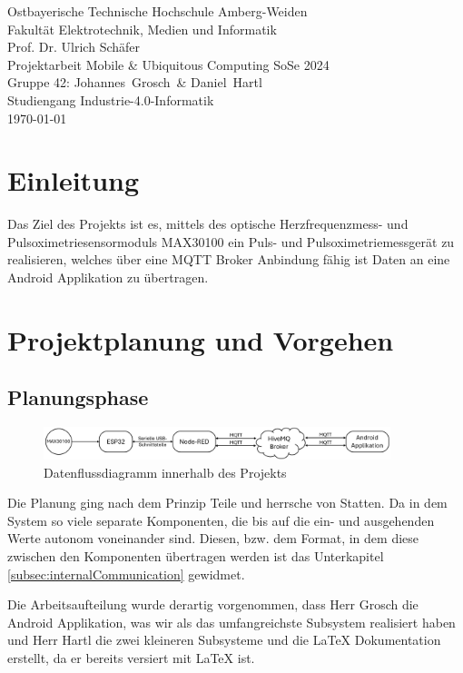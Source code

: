 \documentclass[12pt,oneside]{article}
\newcommand*{\IhrVornameEins}{Johannes}
\newcommand*{\IhrNachnameEins}{Grosch}
\newcommand*{\IhrVornameZwei}{Daniel}
\newcommand*{\IhrNachnameZwei}{Hartl}
\newcommand*{\IhreGruppe}{Gruppe 42}
\newcommand*{\IhrStudiengang}{Industrie-4.0-Informatik}
\newcommand*{\IhreArbeit}{Projektarbeit Mobile \& Ubiquitous Computing SoSe 2024}
\newcommand*{\IhrErstpruefer}{Prof. Dr. Ulrich Schäfer}
\newcommand{\quoteM}[1]{\glqq {#1}\grqq{}}
\begin{document}
  \thispagestyle{empty}
  \originalTeX
  \begin{center}
 	\Large
 	Ostbayerische Technische Hochschule Amberg-Weiden\\
 Fakultät Elektrotechnik, Medien und Informatik\\[.8cm]
 \large \IhrErstpruefer\\[.8cm]
 \Large \IhreArbeit\\[.8cm]
 \large \IhreGruppe: \IhrVornameEins\ \IhrNachnameEins\ \&
 \IhrVornameZwei\ \IhrNachnameZwei\\[.8cm]
 \large Studiengang \IhrStudiengang\\[.8cm]
 \today\\[2.5cm]
  \end{center}
  
  \tableofcontents

  \clearpage
  
  
  \section{Einleitung}
	Das Ziel des Projekts ist es, mittels des optische Herzfrequenzmess- und Pulsoximetriesensormoduls MAX30100\cite{max30100breakout} ein Puls- und Pulsoximetriemessgerät zu realisieren, welches über eine MQTT Broker Anbindung fähig ist Daten an eine Android Applikation zu übertragen.


  
  \section{Projektplanung und Vorgehen}
  \subsection{Planungsphase}
	\begin{figure}[tph!]
	 	\includegraphics[width=0.9\textwidth]{kommunikationsdiagramm}
	 	\caption{Datenflussdiagramm innerhalb des Projekts}
	 	\label{fig:datadiagram}
	\end{figure}
	Die Planung ging nach dem Prinzip \quoteM{Divide et impera} Teile und herrsche von Statten. Da in dem System so viele separate Komponenten, die bis auf die ein- und ausgehenden Werte autonom voneinander sind. Diesen, bzw. dem Format, in dem diese zwischen den Komponenten übertragen werden ist das Unterkapitel \ref{subsec:internalCommunication} gewidmet.\par
	Die Arbeitsaufteilung wurde derartig vorgenommen, dass Herr Grosch die Android Applikation, was wir als das umfangreichste Subsystem realisiert haben und Herr Hartl die zwei kleineren Subsysteme und die \LaTeX{} Dokumentation erstellt, da er bereits versiert mit \LaTeX{} ist.
\end{document}
